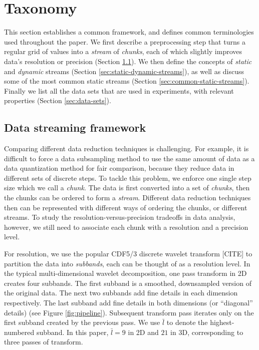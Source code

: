 \section{Taxonomy}
\label{sec:terminologies}

This section establishes a common framework, and defines common terminologies used throughout the
paper. We first describe a preprocessing step that turns a regular grid of values into a
\emph{stream} of \emph{chunks}, each of which slightly improves data's resolution or precision
(Section \ref{sec:raw-to-stream}). We then define the concepts of \emph{static} and \emph{dynamic}
streams (Section \ref{sec:static-dynamic-streams}), as well as discuss some of the most common
static streams (Section \ref{sec:common-static-streams}). Finally we list all the data sets that are
used in experiments, with relevant properties (Section \ref{sec:data-sets}).

\subsection{Data streaming framework}
\label{sec:raw-to-stream}

Comparing different data reduction techniques is challenging. For example, it is difficult to force
a data subsampling method to use the same amount of data as a data quantization method for fair
comparison, because they reduce data in different sets of discrete steps. To tackle this problem, we
enforce one single step size which we call a \emph{chunk}. The data is first converted into a set of
\emph{chunks}, then the chunks can be ordered to form a \emph{stream}. Different data reduction
techniques then can be represented with different ways of ordering the chunks, or different streams.
To study the resolution-versus-precision tradeoffs in data analysis, however, we still need to
associate each chunk with a resolution and a precision level.

For resolution, we use the popular CDF5/3 discrete wavelet transform [CITE] to partition the data
into \emph{subbands}, each can be thought of as a resolution level. In the typical multi-dimensional
wavelet decomposition, one pass transform in 2D creates four subbands. The first subband is a
smoothed, downsampled version of the original data. The next two subbands add fine details in each
dimension respectively. The last subband add fine details in both dimensions (or ``diagonal''
details) (see Figure \ref{fig:pipeline}). Subsequent transform pass iterates only on the first
subband created by the previous pass. We use $\bar{l}$ to denote the highest-numbered subband. In
this paper, $\bar{l}=9$ in 2D and $21$ in 3D, corresponding to three passes of transform.

